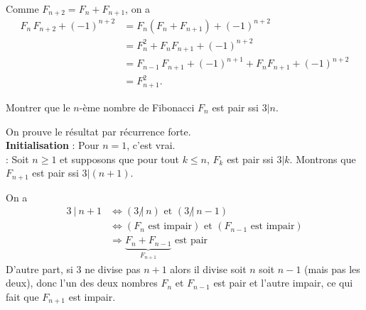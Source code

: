 \begin{exo}
\begin{sol}
\begin{enumerate}
Comme $F_{n+2} = F_n+F_{n+1}$, on a 
\begin{align*}
F_{n}\,F_{n+2} + (-1)^{n+2}
&= F_{n}(F_n+F_{n+1}) + (-1)^{n+2}\\
&= F_n^2+F_nF_{n+1}+ (-1)^{n+2}\\
&= F_{n-1}\,F_{n+1} + (-1)^{n+1} + F_nF_{n+1}+ (-1)^{n+2}\\
&= F_{n+1}^2.
\end{align*}
\end{enumerate}
\end{sol}

\end{exo}

\begin{exo}
Montrer que le $n$-ème nombre de Fibonacci $F_n$ est pair ssi $3|n$.
\begin{sol}
On prouve le résultat par récurrence forte.\\
\textbf{Initialisation} : Pour $n=1$, c'est vrai.\\
 : Soit $n\geq 1$ et supposons que pour tout $k\leq n$,  $F_k$ est pair ssi $3|k$. Montrons que $F_{n+1}$ est pair ssi $3|(n+1)$.\\

On a 
\begin{align*}
3~|~n+1
&\Leftrightarrow  (3~\not|~n)\text{ et } (3~\not|~n-1)\\
&\Leftrightarrow (F_n \text{ est impair}) \text{ et } (F_{n-1} \text{ est impair})\\
&\Rightarrow \underbrace{F_n+F_{n-1}}_{F_{n+1}} \text{ est pair}
\end{align*}
D'autre part, si $3$ ne divise pas $n+1$ alors il divise soit $n$ soit $n-1$ (mais pas les deux), donc l'un des deux nombres $F_n$ et $F_{n-1}$ est pair et l'autre impair, ce qui fait que $F_{n+1}$ est impair.

\end{sol}
\end{exo}





